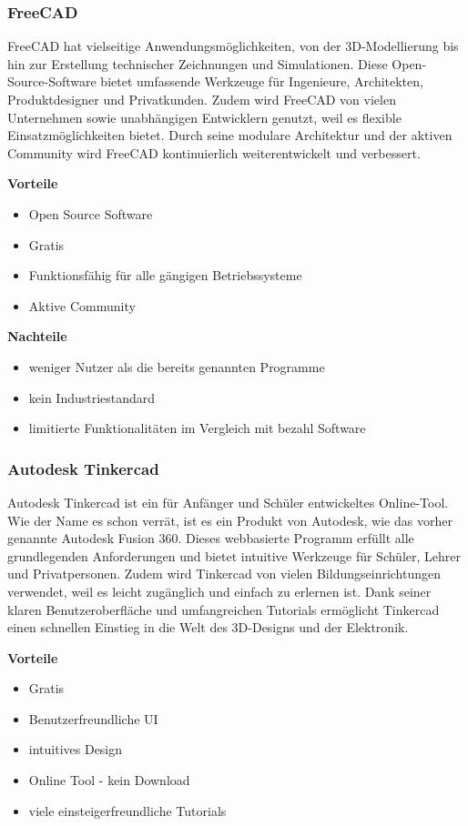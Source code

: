 \subsubsection{FreeCAD}
FreeCAD hat vielseitige Anwendungsmöglichkeiten, von der 3D-Modellierung bis hin zur Erstellung technischer Zeichnungen und Simulationen. Diese Open-Source-Software bietet umfassende Werkzeuge für Ingenieure, Architekten, Produktdesigner und Privatkunden. Zudem wird FreeCAD von vielen Unternehmen sowie unabhängigen Entwicklern genutzt, weil es flexible Einsatzmöglichkeiten bietet. Durch seine modulare Architektur und der aktiven Community wird FreeCAD kontinuierlich weiterentwickelt und verbessert. \cite{FreeCAD}  \cite{FreeCAD_2}

\textbf{Vorteile}
\begin{itemize}
	\item Open Source Software
	\item Gratis
	\item Funktionsfähig für alle gängigen Betriebssysteme
	\item Aktive Community	 
\end{itemize}

\textbf{Nachteile}
\begin{itemize}
	\item weniger Nutzer als die bereits genannten Programme
	\item kein Industriestandard
	\item 	limitierte Funktionalitäten im Vergleich mit bezahl Software \cite{FreeCADReviews}
\end{itemize}

\subsubsection{Autodesk Tinkercad}
Autodesk Tinkercad ist ein für Anfänger und Schüler entwickeltes Online-Tool. Wie der Name es schon verrät, ist es ein Produkt von Autodesk, wie das vorher genannte Autodesk Fusion 360. Dieses webbasierte Programm erfüllt alle grundlegenden Anforderungen und bietet intuitive Werkzeuge für Schüler, Lehrer und Privatpersonen. Zudem wird Tinkercad von vielen Bildungseinrichtungen verwendet, weil es leicht zugänglich und einfach zu erlernen ist. Dank seiner klaren Benutzeroberfläche und umfangreichen Tutorials ermöglicht Tinkercad einen schnellen Einstieg in die Welt des 3D-Designs und der Elektronik. \cite{Tinkercad}

\textbf{Vorteile}
\begin{itemize}
	\item Gratis
	\item Benutzerfreundliche UI
	\item intuitives Design
	\item Online Tool - kein Download 	
	\item viele einsteigerfreundliche Tutorials 
\end{itemize}

